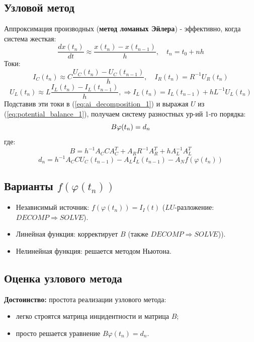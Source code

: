 	\subsection{Узловой метод}
	
	Аппроксимация производных (\textbf{метод ломаных Эйлера}) - эффективно, когда система жесткая:
	\begin{equation}
		\frac{d x(t_n)}{dt} \approx \frac{x(t_n) - x(t_{n-1})}{h}, \quad t_n = t_0 + n h
	\end{equation}
	Токи:
	\begin{equation}
		I_C(t_n) \approx C \frac{U_C(t_n) - U_C(t_{n-1})}{h}, \quad I_R(t_n) = R^{-1} U_R(t_n)
	\end{equation}
	\begin{equation}
		U_L(t_n) \approx L \frac{I_L(t_n) - I_L(t_{n-1})}{h}, \Rightarrow I_L(t_n) = I_L(t_{n-1}) + h L^{-1} U_L(t_n)
	\end{equation}
	Подставив эти токи в (\ref{eq:ai_decomposition_1}) и выражая $U$ из (\ref{eq:potential_balance_1}), получаем систему разностных ур-ий 1-го порядка:
	\begin{equation}
		B \varphi(t_n) = d_n
		\vspace{-1em}
	\end{equation}
	где:
	\begin{equation}
		B = h^{-1} A_C C A_C^T + A_R R^{-1} A_R^T + h A_L^{-1} A_L^T
	\end{equation}
	\begin{equation}
		d_n = h^{-1} A_C C U_C(t_{n-1}) - A_L I_L(t_{n-1}) - A_N f(\varphi(t_n))
	\end{equation}
	\subsection{Варианты $f(\varphi(t_n))$}
	\begin{itemize}
		\item Независимый источник: $f(\varphi(t_n)) = I_I(t)$ ($LU$-разложение: $DECOMP \Rightarrow SOLVE$).
		\item Линейная функция: корректирует $B$ (также $DECOMP \Rightarrow SOLVE$)).
		\item Нелинейная функция: решается методом Ньютона.
	\end{itemize}
	
	\subsection{Оценка узлового метода}
	\textbf{Достоинство:} простота реализации узлового метода:
	\begin{itemize}
		\item легко строятся матрица инцидентности и матрица \( B \);
		\item просто решается уравнение $B \varphi(t_n) = d_n$.
	\end{itemize}
	
